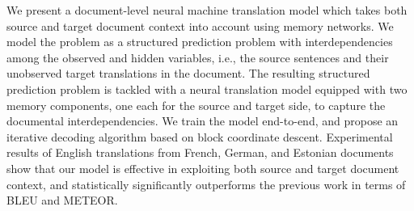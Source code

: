 We present a document-level neural machine translation model which takes both source and target document context into account using memory networks. We model the problem as a structured prediction problem with interdependencies among the observed and hidden variables, i.e., the source sentences and their unobserved target translations in the document. The resulting structured prediction problem is tackled with a neural translation model equipped with two memory components, one each for the source and target side, to capture the documental interdependencies. We train the model end-to-end, and propose an iterative decoding algorithm based on block coordinate descent. Experimental results of English translations from French, German, and Estonian documents show that our model is effective in exploiting both source and target document context, and statistically significantly outperforms the previous work in terms of BLEU and METEOR.
